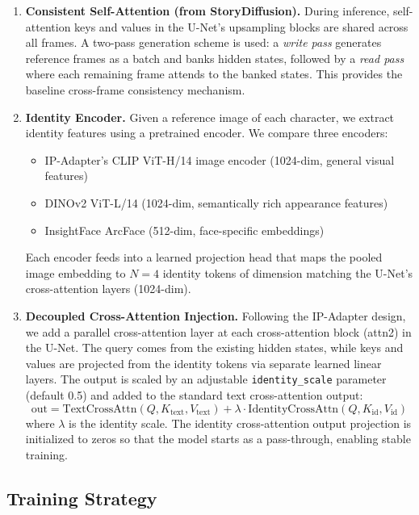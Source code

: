 \documentclass[11pt]{article}
\begin{document}
\begin{enumerate}[leftmargin=*]
    \item \textbf{Consistent Self-Attention (from StoryDiffusion).} During inference, self-attention keys and values in the U-Net's upsampling blocks are shared across all frames. A two-pass generation scheme is used: a \emph{write pass} generates reference frames as a batch and banks hidden states, followed by a \emph{read pass} where each remaining frame attends to the banked states. This provides the baseline cross-frame consistency mechanism.

    \item \textbf{Identity Encoder.} Given a reference image of each character, we extract identity features using a pretrained encoder. We compare three encoders:
    \begin{itemize}
        \item IP-Adapter's CLIP ViT-H/14 image encoder (1024-dim, general visual features)
        \item DINOv2 ViT-L/14 (1024-dim, semantically rich appearance features)
        \item InsightFace ArcFace (512-dim, face-specific embeddings)
    \end{itemize}
    Each encoder feeds into a learned projection head that maps the pooled image embedding to $N=4$ identity tokens of dimension matching the U-Net's cross-attention layers (1024-dim).

    \item \textbf{Decoupled Cross-Attention Injection.} Following the IP-Adapter design, we add a parallel cross-attention layer at each cross-attention block (attn2) in the U-Net. The query comes from the existing hidden states, while keys and values are projected from the identity tokens via separate learned linear layers. The output is scaled by an adjustable \texttt{identity\_scale} parameter (default 0.5) and added to the standard text cross-attention output:
    \begin{equation}
        \text{out} = \text{TextCrossAttn}(Q, K_\text{text}, V_\text{text}) + \lambda \cdot \text{IdentityCrossAttn}(Q, K_\text{id}, V_\text{id})
    \end{equation}
    where $\lambda$ is the identity scale. The identity cross-attention output projection is initialized to zeros so that the model starts as a pass-through, enabling stable training.
\end{enumerate}

\subsection{Training Strategy}
\end{document}
